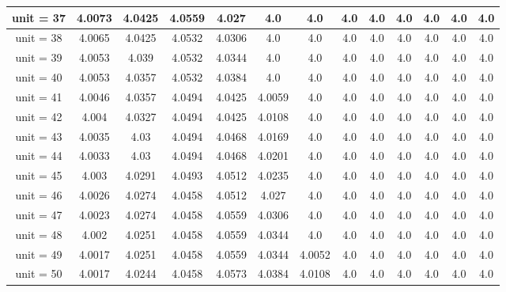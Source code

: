 \begin{table*}[ht]
\begin{tabular}{|c|c|c|c|c|c|c|c|c|c|c|c|c|}
\hline
unit = 37 &
4.0073 & 4.0425 & 4.0559 & 4.027 & 4.0 & 4.0 & 4.0 & 4.0 & 4.0 & 4.0 & 4.0 & 4.0 \\
\hline
unit = 38 &
4.0065 & 4.0425 & 4.0532 & 4.0306 & 4.0 & 4.0 & 4.0 & 4.0 & 4.0 & 4.0 & 4.0 & 4.0 \\
\hline
unit = 39 &
4.0053 & 4.039 & 4.0532 & 4.0344 & 4.0 & 4.0 & 4.0 & 4.0 & 4.0 & 4.0 & 4.0 & 4.0 \\
\hline
unit = 40 &
4.0053 & 4.0357 & 4.0532 & 4.0384 & 4.0 & 4.0 & 4.0 & 4.0 & 4.0 & 4.0 & 4.0 & 4.0 \\
\hline
unit = 41 &
4.0046 & 4.0357 & 4.0494 & 4.0425 & 4.0059 & 4.0 & 4.0 & 4.0 & 4.0 & 4.0 & 4.0 & 4.0 \\
\hline
unit = 42 &
4.004 & 4.0327 & 4.0494 & 4.0425 & 4.0108 & 4.0 & 4.0 & 4.0 & 4.0 & 4.0 & 4.0 & 4.0 \\
\hline
unit = 43 &
4.0035 & 4.03 & 4.0494 & 4.0468 & 4.0169 & 4.0 & 4.0 & 4.0 & 4.0 & 4.0 & 4.0 & 4.0 \\
\hline
unit = 44 &
4.0033 & 4.03 & 4.0494 & 4.0468 & 4.0201 & 4.0 & 4.0 & 4.0 & 4.0 & 4.0 & 4.0 & 4.0 \\
\hline
unit = 45 &
4.003 & 4.0291 & 4.0493 & 4.0512 & 4.0235 & 4.0 & 4.0 & 4.0 & 4.0 & 4.0 & 4.0 & 4.0 \\
\hline
unit = 46 &
4.0026 & 4.0274 & 4.0458 & 4.0512 & 4.027 & 4.0 & 4.0 & 4.0 & 4.0 & 4.0 & 4.0 & 4.0 \\
\hline
unit = 47 &
4.0023 & 4.0274 & 4.0458 & 4.0559 & 4.0306 & 4.0 & 4.0 & 4.0 & 4.0 & 4.0 & 4.0 & 4.0 \\
\hline
unit = 48 &
4.002 & 4.0251 & 4.0458 & 4.0559 & 4.0344 & 4.0 & 4.0 & 4.0 & 4.0 & 4.0 & 4.0 & 4.0 \\
\hline
unit = 49 &
4.0017 & 4.0251 & 4.0458 & 4.0559 & 4.0344 & 4.0052 & 4.0 & 4.0 & 4.0 & 4.0 & 4.0 & 4.0 \\
\hline
unit = 50 &
4.0017 & 4.0244 & 4.0458 & 4.0573 & 4.0384 & 4.0108 & 4.0 & 4.0 & 4.0 & 4.0 & 4.0 & 4.0 \\
\hline
\end{tabular}
\normalsize
\end{table*}
